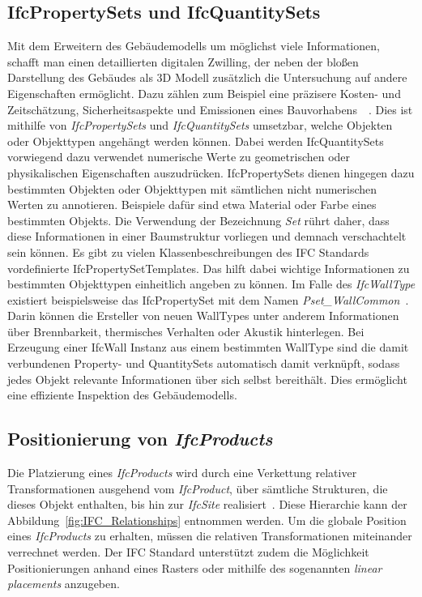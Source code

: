 \subsection{IfcPropertySets und IfcQuantitySets}\label{basics:ifc_properties}
Mit dem Erweitern des Gebäudemodells um möglichst viele Informationen, schafft man einen detaillierten digitalen Zwilling, der neben der bloßen Darstellung des Gebäudes als 3D Modell zusätzlich die Untersuchung auf andere Eigenschaften ermöglicht.
Dazu zählen zum Beispiel eine präzisere Kosten- und Zeitschätzung, Sicherheitsaspekte und Emissionen eines Bauvorhabens~\cite{Industry93:online}~\cite{Ding2014}. 
Dies ist mithilfe von \textit{IfcPropertySets} und \textit{IfcQuantitySets} umsetzbar, welche Objekten oder Objekttypen angehängt werden können.
Dabei werden IfcQuantitySets vorwiegend dazu verwendet numerische Werte zu geometrischen oder physikalischen Eigenschaften auszudrücken.
IfcPropertySets dienen hingegen dazu bestimmten Objekten oder Objekttypen mit sämtlichen nicht numerischen Werten zu annotieren.
Beispiele dafür sind etwa Material oder Farbe eines bestimmten Objekts.
Die Verwendung der Bezeichnung \textit{Set} rührt daher, dass diese Informationen in einer Baumstruktur vorliegen und demnach verschachtelt sein können.
Es gibt zu vielen Klassenbeschreibungen des IFC Standards vordefinierte IfcPropertySetTemplates.
Das hilft dabei wichtige Informationen zu bestimmten Objekttypen einheitlich angeben zu können.
Im Falle des \textit{IfcWallType} existiert beispielsweise das IfcPropertySet mit dem Namen \textit{Pset\_WallCommon}~\cite{IFC4310PSetWallCommon:online}.
Darin können die Ersteller von neuen WallTypes unter anderem Informationen über Brennbarkeit, thermisches Verhalten oder Akustik hinterlegen.
Bei Erzeugung einer IfcWall Instanz aus einem bestimmten WallType sind die damit verbundenen Property- und QuantitySets automatisch damit verknüpft, sodass jedes Objekt relevante Informationen über sich selbst bereithält.
Dies ermöglicht eine effiziente Inspektion des Gebäudemodells.

\subsection{Positionierung von \textit{IfcProducts}}
Die Platzierung eines \textit{IfcProducts} wird durch eine Verkettung relativer Transformationen ausgehend vom \textit{IfcProduct}, über sämtliche Strukturen, die dieses Objekt enthalten, bis hin zur \textit{IfcSite} realisiert~\cite{IFCPlatzierung}.
Diese Hierarchie kann der Abbildung~\ref{fig:IFC_Relationships} entnommen werden.
Um die globale Position eines \textit{IfcProducts} zu erhalten, müssen die relativen Transformationen miteinander verrechnet werden.
Der IFC Standard unterstützt zudem die Möglichkeit Positionierungen anhand eines Rasters oder mithilfe des sogenannten \textit{linear placements} anzugeben.

